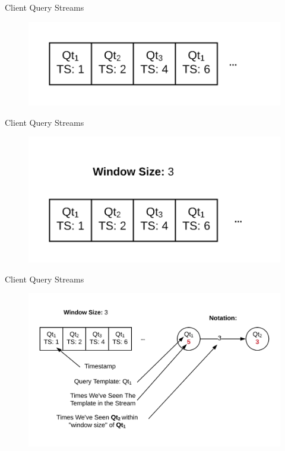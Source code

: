 \documentclass[10pt]{beamer}
\begin{document}
\begin{frame}[fragile]{Client Query Streams}
    \begin{figure}
        \includegraphics[scale=0.2]{apollo_client_query_stream}
    \end{figure}
\end{frame}

\begin{frame}[fragile]{Client Query Streams}
    \begin{figure}
        \includegraphics[scale=0.2]{apollo_client_query_stream_2}
    \end{figure}
\end{frame}

\begin{frame}[fragile]{Client Query Streams}
    \begin{figure}
        \includegraphics[scale=0.2]{apollo_client_query_stream_2_1}
    \end{figure}
\end{frame}
\end{document}

